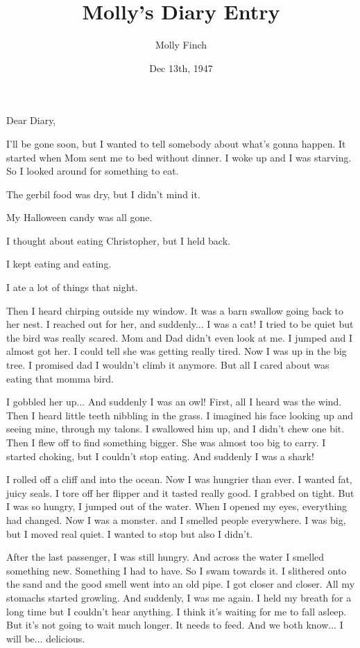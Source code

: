 \documentclass[10pt,a4paper]{article}
\begin{document}
\title{Molly's Diary Entry}
\date{Dec 13th, 1947}
\author{Molly Finch}
\maketitle
    
\thispagestyle{plain}
\setcounter{page}{1}
\linenumbers

Dear Diary,

I'll be gone soon, but I wanted to tell somebody about what's gonna happen. It started when Mom sent me to bed without dinner. I woke up and I was starving. So I looked around for something to eat.

The gerbil food was dry, but I didn't mind it.

My Halloween candy was all gone.

I thought about eating Christopher, but I held back.

I kept eating and eating.

I ate a lot of things that night.

Then I heard chirping outside my window. It was a barn swallow going back to her nest. I reached out for her, and suddenly... I was a cat! I tried to be quiet but the bird was really scared. Mom and Dad didn't even look at me. I jumped and I almost got her. I could tell she was getting really tired. Now I was up in the big tree. I promised dad I wouldn't climb it anymore. But all I cared about was eating that momma bird.

I gobbled her up... And suddenly I was an owl! First, all I heard was the wind. Then I heard little teeth nibbling in the grass. I imagined his face looking up and seeing mine, through my talons. I swallowed him up, and I didn't chew one bit. Then I flew off to find something bigger. She was almost too big to carry. I started choking, but I couldn't stop eating. And suddenly I was a shark!

I rolled off a cliff and into the ocean. Now I was hungrier than ever. I wanted fat, juicy seals. I tore off her flipper and it tasted really good. I grabbed on tight. But I was so hungry, I jumped out of the water. When I opened my eyes, everything had changed. Now I was a monster. and I smelled people everywhere. I was big, but I moved real quiet. I wanted to stop but also I didn't.

After the last passenger, I was still hungry. And across the water I smelled something new. Something I had to have. So I swam towards it. I slithered onto the sand and the good smell went into an old pipe. I got closer and closer. All my stomachs started growling. And suddenly, I was me again. I held my breath for a long time but I couldn't hear anything. I think it's waiting for me to fall asleep. But it's not going to wait much longer. It needs to feed. And we both know... I will be... delicious.
\end{document}
